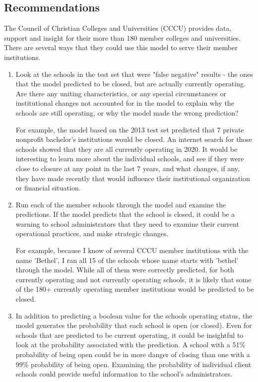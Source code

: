 \documentclass[11pt, letterpaper]{article}
\begin{document}
\subsection{Recommendations}
The Council of Christian Colleges and Universities (CCCU) provides data, support and insight for their more than 180 member colleges and universities. There are several ways that they could use this model to serve their member institutions.

\begin{enumerate}

\item Look at the schools in the test set that were "false negative" results - the ones that the model predicted to be closed, but are actually currently operating. Are there any uniting characteristics, or any special circumstances or institutional changes not accounted for in the model to explain why the schools are still operating, or why the model made the wrong prediction?

For example, the model based on the 2013 test set predicted that 7 private nonprofit bachelor's institutions would be closed. An internet search for those schools showed that they are all currently operating in 2020. It would be interesting to learn more about the individual schools, and see if they were close to closure at any point in the last 7 years, and what changes, if any, they have made recently that would influence their institutional organization or financial situation.

\item Run each of the member schools through the model and examine the predictions. If the model predicts that the school is closed, it could be a warning to school administrators that they need to examine their current operational practices, and make strategic changes.

For example, because I know of several CCCU member institutions with the name 'Bethel', I ran all 15 of the schools whose name starts with 'bethel' through the model. While all of them were correctly predicted, for both currently operating and not currently operating schools, it is likely that some of the 180+ currently operating member institutions would be predicted to be closed.

\item In addition to predicting a boolean value for the schools operating status, the model generates the probability that each school is open (or closed). Even for schools that are predicted to be current operating, it could be insightful to look at the probability associated with the prediction. A school with a 51\% probability of being open could be in more danger of closing than one with a 99\% probability of being open. Examining the probability of individual client schools could provide useful information to the school's administrators.
\end{enumerate}
\end{document}

